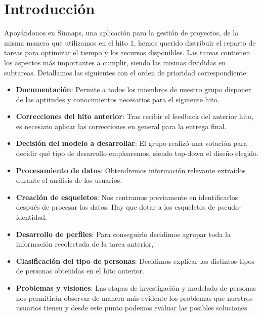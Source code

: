 \documentclass[12pt]{article}
\begin{document}
\section{Introducción}
Apoyándonos en Sinnaps, una aplicación para la gestión de proyectos, de la misma manera que utilizamos en el hito 1, hemos querido distribuir el reparto de tareas para optimizar el tiempo y los recursos disponibles. Las tareas contienen los aspectos más importantes a cumplir, siendo las mismas divididas en subtareas. Detallamos las siguientes con el orden de prioridad correspondiente:

\begin{itemize}

\item \textbf{Documentación}: Permite a todos los miembros de nuestro grupo disponer de las aptitudes y conocimientos necesarios para el siguiente hito.

\item \textbf{Correcciones del hito anterior}: Tras recibir el feedback del anterior hito, es
necesario aplicar las correcciones en general para la entrega final.

\item \textbf{Decisión del modelo a desarrollar}​: El grupo realizó una votación para decidir qué tipo de desarrollo emplearemos, siendo top-down el diseño elegido.

\item \textbf{Procesamiento de datos}: Obtendremos información relevante extraídos durante el análisis de los usuarios.

\item \textbf{Creación de esqueletos}: Nos centramos previamente en identificarlos después de procesar los datos. Hay que dotar a los esqueletos de pseudo-identidad.

\item \textbf{Desarrollo de perfiles}: Para conseguirlo decidimos agrupar toda la información recolectada de la tarea anterior,

\item \textbf{Clasificación del tipo de personas}​: Decidimos explicar los distintos tipos de personas obtenidas en el hito anterior.


\item \textbf{Problemas y visiones}​: Las etapas de investigación y modelado de personas nos permitirán observar de manera más evidente los problemas que nuestros usuarios tienen y desde este punto podemos evaluar las posibles soluciones.


\end{itemize}
\end{document}
